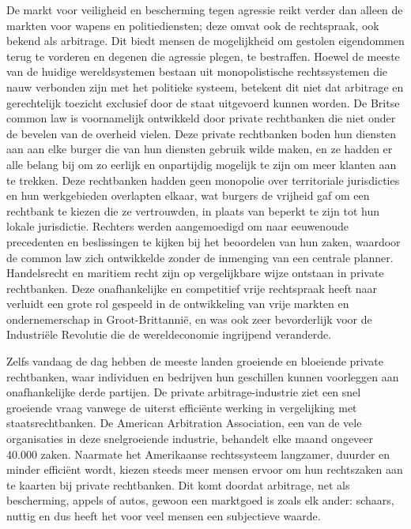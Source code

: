 De markt voor veiligheid en bescherming tegen agressie reikt verder dan alleen de markten voor wapens en politiediensten; deze omvat ook de rechtspraak, ook bekend als arbitrage. Dit biedt mensen de mogelijkheid om gestolen eigendommen terug te vorderen en degenen die agressie plegen, te bestraffen. Hoewel de meeste van de huidige wereldsystemen bestaan uit monopolistische rechtssystemen die nauw verbonden zijn met het politieke systeem, betekent dit niet dat arbitrage en gerechtelijk toezicht exclusief door de staat uitgevoerd kunnen worden. De Britse common law is voornamelijk ontwikkeld door private rechtbanken die niet onder de bevelen van de overheid vielen.\autocite{200} Deze private rechtbanken boden hun diensten aan aan elke burger die van hun diensten gebruik wilde maken, en ze hadden er alle belang bij om zo eerlijk en onpartijdig mogelijk te zijn om meer klanten aan te trekken. Deze rechtbanken hadden geen monopolie over territoriale jurisdicties en hun werkgebieden overlapten elkaar, wat burgers de vrijheid gaf om een rechtbank te kiezen die ze vertrouwden, in plaats van beperkt te zijn tot hun lokale jurisdictie. Rechters werden aangemoedigd om naar eeuwenoude precedenten en beslissingen te kijken bij het beoordelen van hun zaken, waardoor de common law zich ontwikkelde zonder de inmenging van een centrale planner. Handelsrecht en maritiem recht zijn op vergelijkbare wijze ontstaan in private rechtbanken. Deze onafhankelijke en competitief vrije rechtspraak heeft naar verluidt een grote rol gespeeld in de ontwikkeling van vrije markten en ondernemerschap in Groot-Brittannië, en was ook zeer bevorderlijk voor de Industriële Revolutie die de wereldeconomie ingrijpend veranderde.

Zelfs vandaag de dag hebben de meeste landen groeiende en bloeiende private rechtbanken, waar individuen en bedrijven hun geschillen kunnen voorleggen aan onafhankelijke derde partijen. De private arbitrage-industrie ziet een snel groeiende vraag vanwege de uiterst efficiënte werking in vergelijking met staatsrechtbanken. De American Arbitration Association, een van de vele organisaties in deze snelgroeiende industrie, behandelt elke maand ongeveer 40.000 zaken. Naarmate het Amerikaanse rechtssysteem langzamer, duurder en minder efficiënt wordt, kiezen steeds meer mensen ervoor om hun rechtszaken aan te kaarten bij private rechtbanken. Dit komt doordat arbitrage, net als bescherming, appels of auto\textquotesingle s, gewoon een marktgoed is zoals elk ander: schaars, nuttig en dus heeft het voor veel mensen een subjectieve waarde.

